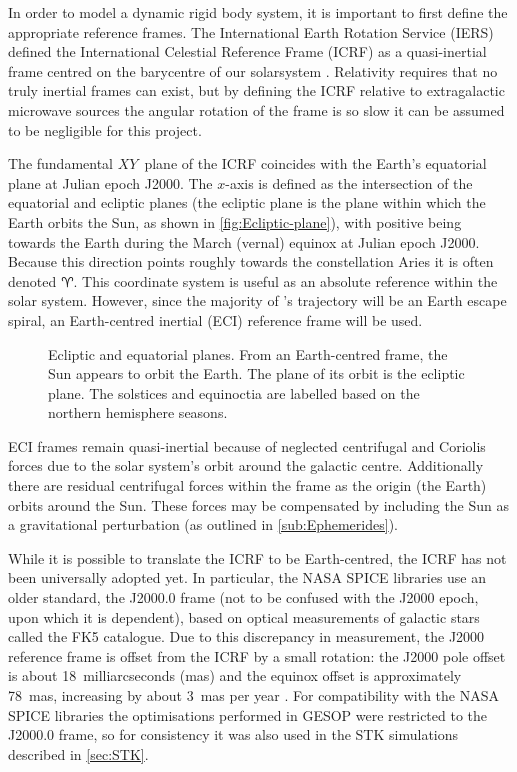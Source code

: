 In order to model a dynamic rigid body system, it is important to first define the appropriate reference frames. The International Earth Rotation Service (IERS) defined the International Celestial Reference Frame (ICRF) as a quasi-inertial frame centred on the barycentre of our solarsystem \parencite{Ma1998}. %
Relativity requires that no truly inertial frames can exist, but by defining the ICRF relative to extragalactic microwave sources the angular rotation of the frame is so slow it can be assumed to be negligible for this project.

The fundamental $XY$~plane of the ICRF coincides with the Earth's equatorial plane at Julian epoch J2000. The $x$-axis is defined as the intersection of the equatorial and ecliptic planes (the ecliptic plane is the plane within which the Earth orbits the Sun, as shown in \autoref{fig:Ecliptic-plane}), with positive being towards the Earth during the March (vernal) equinox at Julian epoch J2000. Because this direction points roughly towards the constellation Aries it is often denoted $\Aries$. This coordinate system is useful as an absolute reference within the solar system. However, since the majority of \BW's trajectory will be an Earth escape spiral, an Earth-centred inertial (ECI) reference frame will be used.

\begin{figure}
\centering
\def\svgwidth{\figurewidth}

\caption{Ecliptic and equatorial planes. From an Earth-centred frame, the Sun appears to orbit the Earth. The plane of its orbit is the ecliptic plane. %
The solstices and equinoctia are labelled based on the northern hemisphere seasons.} \label{fig:Ecliptic-plane}
\end{figure}

ECI frames remain quasi-inertial because of neglected centrifugal and Coriolis forces due to the solar system's orbit around the galactic centre. Additionally there are residual centrifugal forces within the frame as the origin (the Earth) orbits around the Sun. These forces may be compensated by including the Sun as a gravitational perturbation (as outlined in \autoref{sub:Ephemerides}).

While it is possible to translate the ICRF to be Earth-centred, the ICRF has not been universally adopted yet. In particular, the NASA SPICE libraries use an older standard, the J2000.0 frame (not to be confused with the J2000 epoch, upon which it is dependent), based on optical measurements of galactic stars called the FK5 catalogue. Due to this discrepancy in measurement, the J2000 reference frame is offset from the ICRF  by a small rotation: the J2000 pole offset is about 18~milliarcseconds (mas) and the equinox offset is approximately 78~mas, increasing by about 3~mas per year \parencite{Gontier2002}. 
For compatibility with the NASA SPICE libraries the optimisations performed in GESOP were restricted to the J2000.0 frame, so for consistency it was also used in the STK simulations described in \autoref{sec:STK}.


